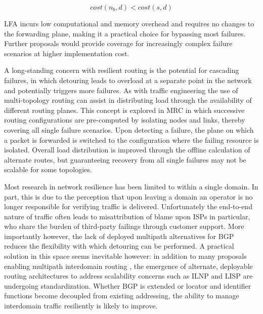 \begin{equation}
cost \left (n_b, d \right) < cost \left(s, d \right)
\label{eqn:downstream}
\end{equation}

\ac{LFA} incurs low computational and memory overhead and requires no changes to the forwarding plane, making it a practical choice for bypassing most failures.
Further proposals \cite{Atlas:2006p520,Bryant:2007p522,Shand:2011p521} would provide coverage for increasingly complex failure scenarios at higher implementation cost.

A long-standing concern with resilient routing is the potential for cascading failures, in which detouring leads to overload at a separate point in the network and potentially triggers more failures.
As with traffic engineering the use of multi-topology routing can assist in distributing load through the availability of different routing planes.
This concept is explored in \ac{MRC} in which successive routing configurations are pre-computed by isolating nodes and links, thereby covering all single failure scenarios.
Upon detecting a failure, the plane on which a packet is forwarded is switched to the configuration where the failing resource is isolated.
Overall load distribution is improved through the offline calculation of alternate routes, but guaranteeing recovery from all single failures may not be scalable for some topologies.

Most research in network resilience has been limited to within a single domain.
In part, this is due to the perception that upon leaving a domain an operator is no longer responsible for verifying traffic is delivered.
Unfortunately the end-to-end nature of traffic often leads to misattribution of blame upon \acp{ISP} in particular, who share the burden of third-party failings through customer support.
More importantly however, the lack of deployed multipath alternatives for \ac{BGP} reduces the flexibility with which detouring can be performed.
A practical solution in this space seems inevitable however: in addition to many proposals enabling multipath interdomain routing \cite{Yang:2003p136,Xu:2006p249,Motiwala:2008p107,Godfrey:2009p36}, the emergence of alternate, deployable routing architectures to address scalability concerns such as \ac{ILNP} \cite{Atkinson:2009p525} and \ac{LISP} \cite{Lewis:2012p523} are undergoing standardization.  
Whether \ac{BGP} is extended or locator and identifier functions become decoupled from existing addressing, the ability to manage interdomain traffic resiliently is likely to improve.


